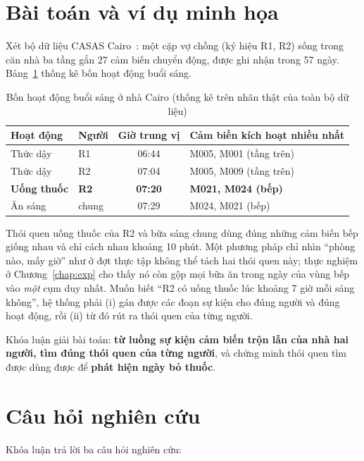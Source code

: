 \section{Bài toán và ví dụ minh họa}
\label{sec:intro-example}

Xét bộ dữ liệu CASAS Cairo~\cite{casas2025zenodo}: một cặp vợ chồng (ký hiệu R1, R2) sống trong
căn nhà ba tầng gắn 27 cảm biến chuyển động, được ghi nhận trong 57 ngày. Bảng~\ref{tab:cairo-morning}
thống kê bốn hoạt động buổi sáng.

\begin{table}[htbp]
\centering
\caption{Bốn hoạt động buổi sáng ở nhà Cairo (thống kê trên nhãn thật của toàn bộ dữ liệu)}
\label{tab:cairo-morning}
\begin{tabular}{llcl}
\toprule
Hoạt động & Người & Giờ trung vị & Cảm biến kích hoạt nhiều nhất \\
\midrule
Thức dậy & R1 & 06:44 & M005, M001 (tầng trên) \\
Thức dậy & R2 & 07:04 & M005, M009 (tầng trên) \\
\textbf{Uống thuốc} & \textbf{R2} & \textbf{07:20} & \textbf{M021, M024 (bếp)} \\
Ăn sáng & chung & 07:29 & M024, M021 (bếp) \\
\bottomrule
\end{tabular}
\end{table}

Thói quen uống thuốc của R2 và bữa sáng chung dùng đúng những cảm biến bếp giống nhau và chỉ cách
nhau khoảng 10 phút. Một phương pháp chỉ nhìn ``phòng nào, mấy giờ'' như ở đợt thực tập không thể
tách hai thói quen này; thực nghiệm ở Chương~\ref{chap:exp} cho thấy nó còn gộp mọi bữa ăn trong
ngày của vùng bếp vào \emph{một} cụm duy nhất. Muốn biết ``R2 có uống thuốc lúc khoảng 7 giờ mỗi
sáng không'', hệ thống phải (i) gán được các đoạn sự kiện cho đúng người và đúng hoạt động, rồi
(ii) từ đó rút ra thói quen của từng người.

Khóa luận giải bài toán: \textbf{từ luồng sự kiện cảm biến trộn lẫn của nhà hai người, tìm đúng
thói quen của từng người}, và chứng minh thói quen tìm được dùng được để \textbf{phát hiện ngày bỏ
thuốc}.

\section{Câu hỏi nghiên cứu}

Khóa luận trả lời ba câu hỏi nghiên cứu:

